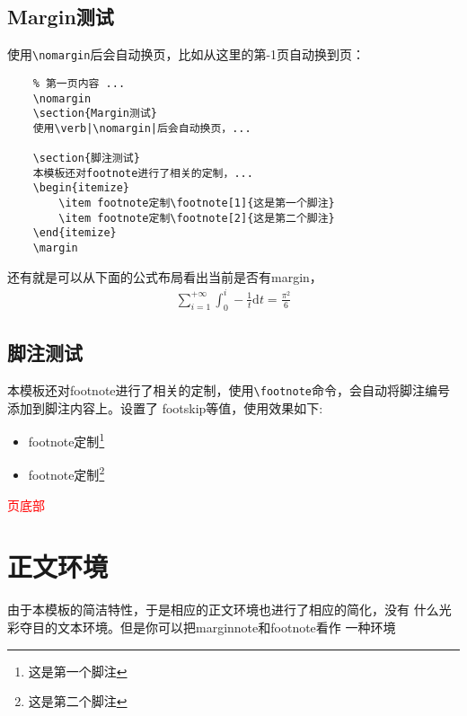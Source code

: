 \documentclass[lang=cn, math=mathptmx]{ZLaTeX}
\begin{document}
\subsection{Margin测试}
使用\verb|\nomargin|后会自动换页，比如从这里的第\number\numexpr\value{page}-1页自动换到\thepage{}页：
\begin{verbatim}
    % 第一页内容 ...
    \nomargin
    \section{Margin测试}
    使用\verb|\nomargin|后会自动换页，...

    \section{脚注测试}
    本模板还对footnote进行了相关的定制，...
    \begin{itemize}
        \item footnote定制\footnote[1]{这是第一个脚注}
        \item footnote定制\footnote[2]{这是第二个脚注}
    \end{itemize}
    \margin
\end{verbatim}

还有就是可以从下面的公式布局看出当前是否有margin，
\begin{align}
    \sum_{i=1}^{+\infty}{\int_{0}^{i}-\frac{1}{t}\mathrm{d}t} = \frac{\pi^2}{6}
\end{align}


\subsection{脚注测试}
本模板还对footnote进行了相关的定制，使用\verb|\footnote|命令，会自动将脚注编号添加到脚注内容上。设置了
footskip等值，使用效果如下:
\begin{itemize}
    \item footnote定制\footnote[1]{这是第一个脚注}
    \item footnote定制\footnote[2]{这是第二个脚注}
\end{itemize}
\vfill 

\textcolor{red}{\thepage{}页底部}
\margin




\section{正文环境}
由于本模板的简洁特性，于是相应的正文环境也进行了相应的简化，没有 
什么光彩夺目的文本环境。但是你可以把marginnote和footnote看作
一种环境
\end{document}
